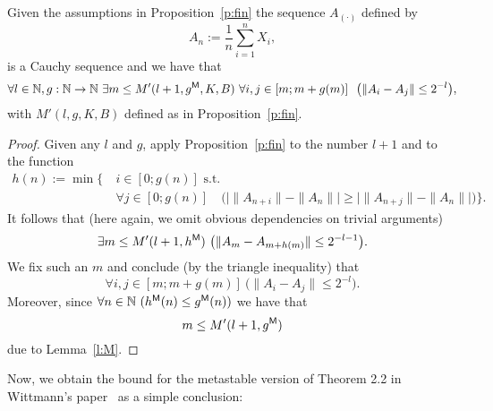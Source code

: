 \begin{thm} \label{t:finInt}
Given the assumptions in Proposition~\ref{p:fin} the sequence $A_{(\cdot)}$ defined by
\[
A_n:=\frac{1}{n}\sum^n_{i=1}X_i,
\]
is a Cauchy sequence and we have that
\[
\forall l\in\mathbb{N},g:\mathbb{N}\to\mathbb{N}\ \exists m\leq M'(l+1,g\protect{^{\textsf{\upshape M}}},K,B)\ \forall i,j\in[m;m+g(m)]\ \ \big( \|A_{i}-A_{j}\|\leq 2^{-l} \big),
\]
with $M'(l,g,K, B)$ defined as in Proposition~\ref{p:fin}.
\end{thm}
\begin{proof}
Given any $l$ and $g$, apply Proposition~\ref{p:fin} to the number $l+1$ and to the function
\begin{align*}
h(n):=\min\Big\{\ &i\in [0;g(n)] \text{ s.t. }\\
 &\forall j\in[0;g(n)]\quad \Big(\big| \|A_{n+i}\| - \|A_n\| \big| \geq \big| \|A_{n+j}\|- \|A_n\|\big|\Big) \Big\}.
\end{align*}
It follows that (here again, we omit obvious dependencies on trivial arguments)
\[
\exists m\leq M'(l+1,h\protect{^{\textsf{\upshape M}}})\ \big( \|A_{m}-A_{m+h(m)}\|\leq 2^{-l-1} \big).
\]
We fix such an $m$ and conclude (by the triangle inequality) that
\[
\forall i,j\in[m;m+g(m)]\ \big( \|A_{i}-A_{j}\|\leq 2^{-l} \big).
\]
Moreover, since $\forall n\in\NN\ (h\powM(n)\leq g\powM(n))$ we have that \[m\leq M'(l+1,g\protect{^{\textsf{\upshape M}}})\] due to Lemma~\ref{l:M}.
\end{proof}

Now, we obtain the bound for the metastable version of Theorem 2.2 in Wittmann's paper~\cite{Wittmann90} as a simple conclusion:

